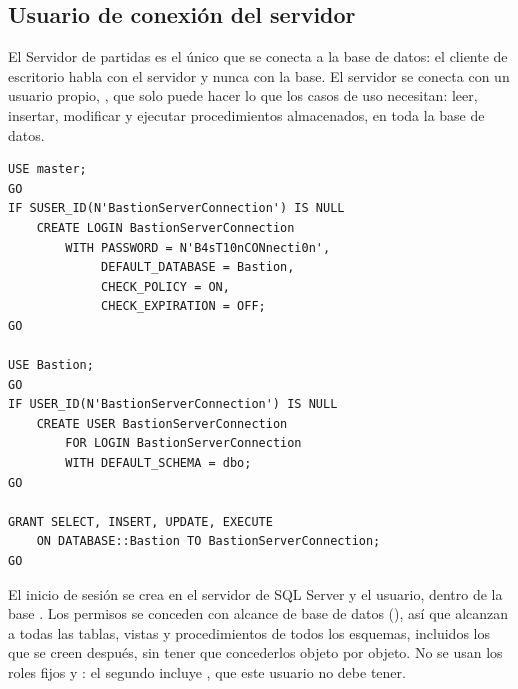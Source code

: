 \subsection*{Usuario de conexión del servidor}

El Servidor de partidas es el único que se conecta a la base de datos: el cliente de escritorio habla con el servidor y nunca con la base. El servidor se conecta con un usuario propio, , que solo puede hacer lo que los casos de uso necesitan: leer, insertar, modificar y ejecutar procedimientos almacenados, en toda la base de datos.

\begin{lstlisting}[style=sql]
USE master;
GO
IF SUSER_ID(N'BastionServerConnection') IS NULL
    CREATE LOGIN BastionServerConnection
        WITH PASSWORD = N'B4sT10nCONnecti0n',
             DEFAULT_DATABASE = Bastion,
             CHECK_POLICY = ON,
             CHECK_EXPIRATION = OFF;
GO

USE Bastion;
GO
IF USER_ID(N'BastionServerConnection') IS NULL
    CREATE USER BastionServerConnection
        FOR LOGIN BastionServerConnection
        WITH DEFAULT_SCHEMA = dbo;
GO

GRANT SELECT, INSERT, UPDATE, EXECUTE
    ON DATABASE::Bastion TO BastionServerConnection;
GO
\end{lstlisting}

El inicio de sesión se crea en el servidor de SQL Server y el usuario, dentro de la base . Los permisos se conceden con alcance de base de datos (), así que alcanzan a todas las tablas, vistas y procedimientos de todos los esquemas, incluidos los que se creen después, sin tener que concederlos objeto por objeto. No se usan los roles fijos  y : el segundo incluye , que este usuario no debe tener.

